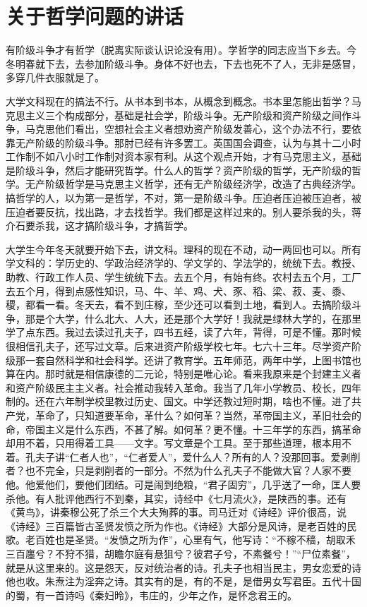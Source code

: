 \section[关于哲学问题的讲话（一九六四年八月十八日）]{关于哲学问题的讲话}


有阶级斗争才有哲学（脱离实际谈认识论没有用）。学哲学的同志应当下乡去。今冬明春就下去，去参加阶级斗争。身体不好也去，下去也死不了人，无非是感冒，多穿几件衣服就是了。

大学文科现在的搞法不行。从书本到书本，从概念到概念。书本里怎能出哲学？马克思主义三个构成部分，基础是社会学，阶级斗争。无产阶级和资产阶级之间作斗争，马克思他们看出，空想社会主义者想劝资产阶级发善心，这个办法不行，要依靠无产阶级的阶级斗争。那肘已经有许多罢工。英国国会调查，认为与其十二小时工作制不如八小时工作制对资本家有利。从这个观点开始，才有马克思主义，基础是阶级斗争，然后才能研究哲学。什么人的哲学？资产阶级的哲学，无产阶级的哲学。无产阶级哲学是马克思主义哲学，还有无产阶级经济学，改造了古典经济学。搞哲学的人，以为第一是哲学，不对，第一是阶级斗争。压迫者压迫被压迫者，被压迫者要反抗，找出路，才去找哲学。我们都是这样过来的。别人要杀我的头，蒋介石要杀我，这才搞阶级斗争，才搞哲学。

大学生今年冬天就要开始下去，讲文科。理科的现在不动，动一两回也可以。所有学文科的：学历史的、学政治经济学的、学文学的、学法学的，统统下去。教授、助教、行政工作人员、学生统统下去。去五个月，有始有终。农村去五个月，工厂去五个月，得到点感性知识，马、牛、羊、鸡、犬、豕、稻、梁、菽、麦、黍、稷，都看一看。冬天去，看不到庄稼，至少还可以看到土地，看到人。去搞阶级斗争，那是个大学，什么北大、人大，还是那个大学好！我就是绿林大学的，在那里学了点东西。我过去读过孔夫子，四书五经，读了六年，背得，可是不懂。那时候很相信孔夫子，还写过文章。后来进资产阶级学校七年。七六十三年。尽学资产阶级那一套自然科学和社会科学。还讲了教育学。五年师范，两年中学，上图书馆也算在内。那时就是相信康德的二元论，特别是唯心论。看来我原来是个封建主义者和资产阶级民主主义者。社会推动我转入革命。我当了几年小学教员、校长，四年制的。还在六年制学校里教过历史、国文。中学还教过短时期，啥也不懂。进了共产党，革命了，只知道要革命，革什么？如何革？当然，革帝国主义，革旧社会的命，帝国主义是什么东西，不甚了解。如何革？更不懂。十三年学的东西，搞革命却用不着，只用得着工具——文字。写文章是个工具。至于那些道理，根本用不着。孔夫子讲“仁者人也”，“仁者爱人”，爱什么人？所有的人？没那回事。爱剥削者？也不完全，只是剥削者的一部分。不然为什么孔夫子不能做大官？人家不要他。他爱他们，要他们团结。可是闹到绝粮，“君子固穷”，几乎送了一命，匡人要杀他。有人批评他西行不到秦，其实，诗经中《七月流火》，是陕西的事。还有《黄鸟》，讲秦穆公死了杀三个大夫殉葬的事。司马迁对《诗经》评价很高，说《诗经》三百篇皆古圣贤发愤之所为作也。《诗经》大部分是风诗，是老百姓的民歌。老百姓也是圣贤。“发愤之所为作”，心里有气，他写诗：“不稼不穑，胡取禾三百廛兮？不狩不猎，胡瞻尔庭有悬狙兮？彼君子兮，不素餐兮！”“尸位素餐”，就是从这里来的。这是怨天，反对统治者的诗。孔夫子也相当民主，男女恋爱的诗他也收。朱焘注为淫奔之诗。其实有的是，有的不是，是借男女写君臣。五代十国的蜀，有一首诗吗《秦妇昤》，韦庄的，少年之作，是怀念君王的。

